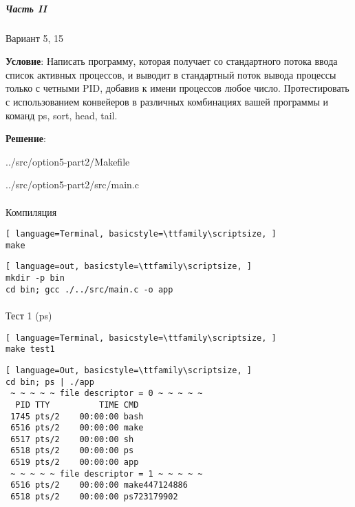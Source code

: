 \subparagraph{Часть II} Вариант 5, 15

\textbf{Условие}:
Написать  программу,  которая  получает  со  стандартного  потока  ввода список активных процессов, и выводит в стандартный поток вывода процессы только с четными PID, добавив к имени процессов любое число. Протестировать с использованием конвейеров в различных комбинациях вашей программы и команд ps, sort, head, tail.

\textbf{Решение}:


{../src/option5-part2/Makefile}

\newpage


{../src/option5-part2/src/main.c}

\newpage

\paragraph{}
Компиляция

\begin{lstlisting}[ language=Terminal, basicstyle=\ttfamily\scriptsize, ]
make
\end{lstlisting}

\begin{lstlisting}[ language=out, basicstyle=\ttfamily\scriptsize, ]
mkdir -p bin
cd bin; gcc ./../src/main.c -o app
\end{lstlisting}
    
\paragraph{}
Тест 1 (ps)

\begin{lstlisting}[ language=Terminal, basicstyle=\ttfamily\scriptsize, ]
make test1
\end{lstlisting}

\begin{lstlisting}[ language=Out, basicstyle=\ttfamily\scriptsize, ]
cd bin; ps | ./app
 ~ ~ ~ ~ ~ file descriptor = 0 ~ ~ ~ ~ ~
  PID TTY          TIME CMD
 1745 pts/2    00:00:00 bash
 6516 pts/2    00:00:00 make
 6517 pts/2    00:00:00 sh
 6518 pts/2    00:00:00 ps
 6519 pts/2    00:00:00 app
 ~ ~ ~ ~ ~ file descriptor = 1 ~ ~ ~ ~ ~
 6516 pts/2    00:00:00 make447124886
 6518 pts/2    00:00:00 ps723179902
\end{lstlisting}

